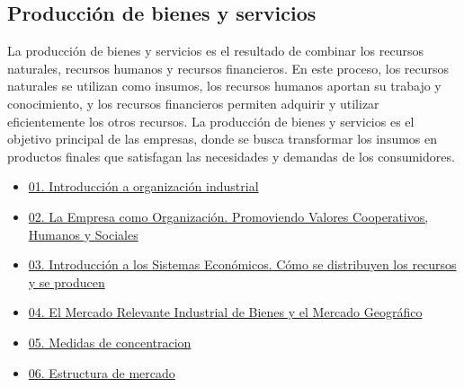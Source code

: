 \documentclass[
  letterpaper,
  DIV=11,
  numbers=noendperiod]{scrartcl}
\begin{document}
\hypertarget{producciuxf3n-de-bienes-y-servicios}{%
\subsection{Producción de bienes y
servicios}\label{producciuxf3n-de-bienes-y-servicios}}

La producción de bienes y servicios es el resultado de combinar los
recursos naturales, recursos humanos y recursos financieros. En este
proceso, los recursos naturales se utilizan como insumos, los recursos
humanos aportan su trabajo y conocimiento, y los recursos financieros
permiten adquirir y utilizar eficientemente los otros recursos. La
producción de bienes y servicios es el objetivo principal de las
empresas, donde se busca transformar los insumos en productos finales
que satisfagan las necesidades y demandas de los consumidores.

\begin{itemize}
\item
  \href{../2023-06-12-introducion-organizacion-industrial-oi-cap1/index.qmd}{01.
  Introducción a organización industrial}
\item
  \href{../2023-06-13-empresa-como-organizacion-oi-cap1/index.qmd}{02.
  La Empresa como Organización. Promoviendo Valores Cooperativos,
  Humanos y Sociales}
\item
  \href{../2023-06-13-sistemas-economicos-oi.cap1/index.qmd}{03.
  Introducción a los Sistemas Económicos. Cómo se distribuyen los
  recursos y se producen}
\item
  \href{../2023-06-15-mercado-relevante-oi-cap2/index.qmd}{04. El
  Mercado Relevante Industrial de Bienes y el Mercado Geográfico}
\item
  \href{../2023-06-16-concentracion-poder-oi-cap3/index.qmd}{05. Medidas
  de concentracion}
\item
  \href{../2023-06-17-estructura-mercado-oi-cap4/index.qmd}{06.
  Estructura de mercado}
\end{itemize}


\printbibliography
\end{document}
